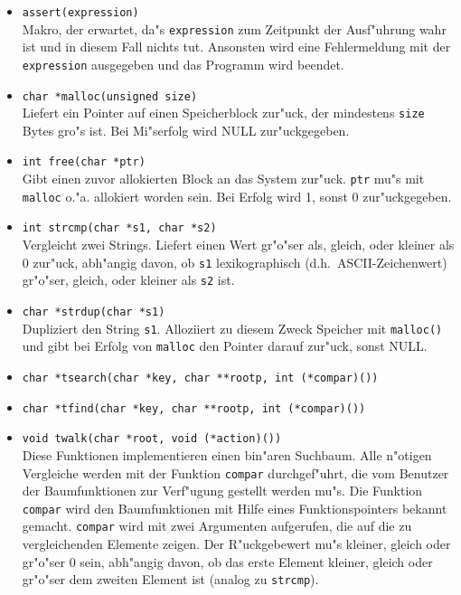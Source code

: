 \begin{itemize}
	\item {\tt assert(expression)}\\
		Makro, der erwartet, da"s {\tt expression} zum Zeitpunkt der Ausf"uhrung
		wahr ist und in diesem Fall nichts tut. Ansonsten wird eine 
		Fehlermeldung mit der {\tt expression} ausgegeben und das Programm wird
		beendet.
	\item {\tt char *malloc(unsigned size)}\\
		Liefert ein Pointer auf einen Speicherblock zur"uck, der mindestens 
		{\tt size}
		Bytes gro"s ist. Bei Mi"serfolg wird NULL zur"uckgegeben.
	\item {\tt int free(char *ptr)}\\
		Gibt einen zuvor allokierten Block an das System zur"uck. {\tt ptr} 
		mu"s mit 
		{\tt malloc} o."a. allokiert worden sein. Bei Erfolg wird 1, sonst
 		0 zur"uckgegeben.
	\item {\tt int strcmp(char *s1, char *s2)}\\
		Vergleicht zwei Strings. Liefert einen Wert gr"o"ser als, gleich, oder
		kleiner als 0 zur"uck, abh"angig davon, ob {\tt s1} lexikographisch
		(d.h.~ASCII-Zeichenwert) gr"o"ser, gleich, oder 
		kleiner als {\tt s2} ist.	
	\item {\tt char *strdup(char *s1)}\\
		Dupliziert den String {\tt s1}. Alloziiert zu diesem Zweck Speicher
		mit {\tt malloc()} und gibt bei Erfolg von {\tt malloc} den 
		Pointer darauf zur"uck, sonst NULL.
	\item {\tt char *tsearch(char *key, char **rootp, int (*compar)())}
	\item {\tt char *tfind(char *key, char **rootp, int (*compar)())}
	\item {\tt void twalk(char *root, void (*action)())}\\
		Diese Funktionen implementieren einen bin"aren Suchbaum. Alle n"otigen
		Vergleiche werden mit der Funktion {\tt compar} durchgef"uhrt, die
		vom Benutzer der Baumfunktionen zur Verf"ugung gestellt werden mu"s. Die
		Funktion {\tt compar} wird den Baumfunktionen mit Hilfe eines
		Funktionspointers bekannt gemacht. {\tt compar} wird mit 
		zwei Argumenten
		aufgerufen, die auf die zu vergleichenden Elemente zeigen. Der 
		R"uckgebewert mu"s kleiner, gleich oder gr"o"ser 0 sein, abh"angig
		davon, ob das erste Element kleiner, gleich oder gr"o"ser dem zweiten
		Element ist (analog zu {\tt strcmp}).


\end{itemize}
